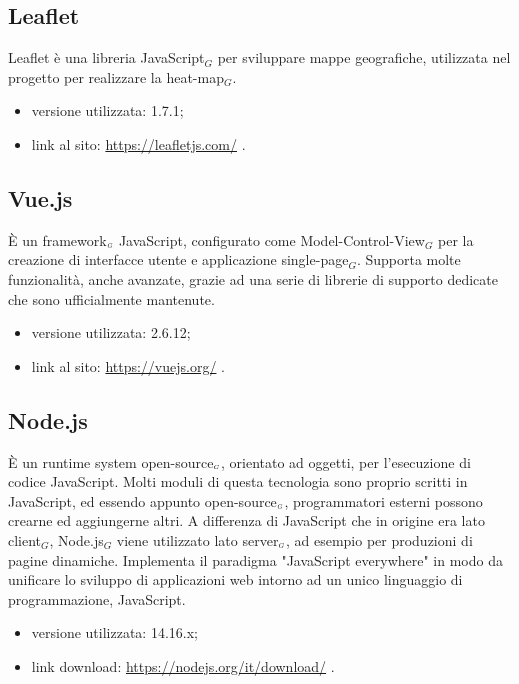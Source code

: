 \subsection{Leaflet} \label{TecnologieLeaflet}
Leaflet è una libreria JavaScript$_G$ per sviluppare mappe geografiche, utilizzata nel progetto per realizzare la heat-map$_G$.
\begin{itemize}
	\item versione utilizzata: 1.7.1;
	\item link al sito: \url{https://leafletjs.com/} .
\end{itemize}


\subsection{Vue.js}\label{TecnologieVue}
È un framework$_{\scaleto{G}{3pt}}$ JavaScript, configurato come Model-Control-View$_G$ per la creazione di interfacce utente e applicazione single-page$_G$.
Supporta molte funzionalità, anche avanzate, grazie ad una serie di librerie di supporto dedicate che sono ufficialmente mantenute.

\begin{itemize}
  \item versione utilizzata: 2.6.12;
  \item link al sito: \url{https://vuejs.org/} .
\end{itemize}

\subsection{Node.js}\label{TecnologieNode}
È un runtime system open-source$_{\scaleto{G}{3pt}}$, orientato ad oggetti, per l'esecuzione di codice JavaScript.
Molti moduli di questa tecnologia sono proprio scritti in JavaScript, ed essendo appunto open-source$_{\scaleto{G}{3pt}}$, programmatori esterni possono crearne ed aggiungerne altri.
A differenza di JavaScript che in origine era lato client$_G$, Node.js$_G$ viene utilizzato lato server$_{\scaleto{G}{3pt}}$, ad esempio per produzioni di pagine dinamiche.
Implementa il paradigma "JavaScript everywhere" in modo da unificare lo sviluppo di applicazioni web intorno ad un unico linguaggio di programmazione, JavaScript.

\begin{itemize}
  \item versione utilizzata: 14.16.x;
  \item link download: \url{https://nodejs.org/it/download/} .
\end{itemize}

